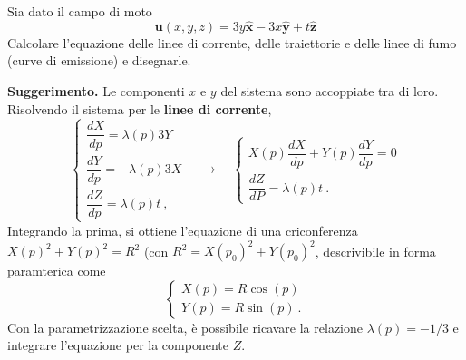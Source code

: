 \begin{exerciseS}
 Sia dato il campo di moto
\begin{equation}
 \bm{u}(x,y,z) = 3y \bm{\hat{x}} - 3x \bm{\hat{y}} +t\bm{\hat{z}}
\end{equation}
Calcolare l'equazione delle linee di corrente, delle traiettorie e delle linee di fumo (curve di emissione) e disegnarle.
\end{exerciseS}

\textbf{Suggerimento.} Le componenti $x$ e $y$ del sistema sono accoppiate tra di loro.
Risolvendo il sistema per le \textbf{linee di corrente}, 
\begin{equation}
 \begin{cases}
  \dfrac{dX}{dp} =  \lambda(p) 3Y \\
  \dfrac{dY}{dp} = -\lambda(p) 3X \\
  \dfrac{dZ}{dp} =  \lambda(p) t \ ,
 \end{cases}
\quad \rightarrow \quad
 \begin{cases}
  X(p) \dfrac{dX}{dp} + Y(p) \dfrac{dY}{dp} = 0 \\
  \dfrac{dZ}{dP} = \lambda(p) t \ .
 \end{cases}
\end{equation}
Integrando la prima, si ottiene l'equazione di una criconferenza $X(p)^2 + Y(p)^2 = R^2$ (con $R^2 = X(p_0)^2 + Y(p_0)^2$, descrivibile in forma paramterica come
\begin{equation}
 \begin{cases}
 X(p) = R \cos(p) \\
 Y(p) = R \sin(p) \ .
 \end{cases}
\end{equation}
Con la parametrizzazione scelta, è possibile ricavare la relazione $\lambda(p) = -1/3$ e integrare l'equazione per la componente $Z$.

